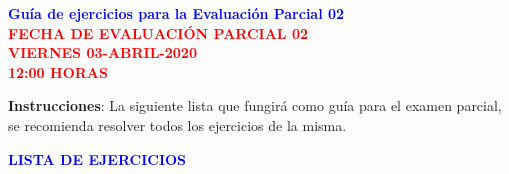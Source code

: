 \documentclass[12pt]{report}
\numberwithin{section}{chapter}
\begin{document}
\begin{center}
\textcolor{blue}{\textbf{\large Guía de ejercicios para la Evaluación Parcial 02}}\\
\vspace{0.5 cm}
\textcolor{red}{\textbf{\large FECHA DE EVALUACIÓN PARCIAL 02 \\ VIERNES 03-ABRIL-2020\\ 12:00 HORAS}}
\end{center}

\textbf{Instrucciones}: La siguiente lista que fungirá como guía para el examen parcial, se recomienda resolver todos los ejercicios de la misma.

\vspace{1cm}


\begin{center}
\textcolor{blue}{\textbf{\large LISTA DE EJERCICIOS}}
\end{center}
\end{document}
